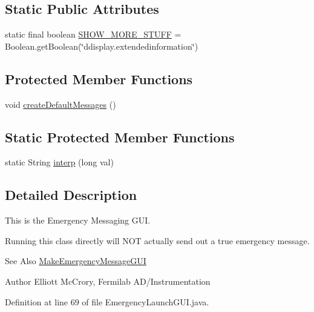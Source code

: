 \subsection*{Static Public Attributes}
\begin{DoxyCompactItemize}
\item 
static final boolean \hyperlink{classgov_1_1fnal_1_1ppd_1_1dd_1_1emergency_1_1EmergencyLaunchGUI_a38b676d30b6ac1c12dbc4b790f93b729}{S\-H\-O\-W\-\_\-\-M\-O\-R\-E\-\_\-\-S\-T\-U\-F\-F} = Boolean.\-get\-Boolean(\char`\"{}ddisplay.\-extendedinformation\char`\"{})
\end{DoxyCompactItemize}
\subsection*{Protected Member Functions}
\begin{DoxyCompactItemize}
\item 
void \hyperlink{classgov_1_1fnal_1_1ppd_1_1dd_1_1emergency_1_1EmergencyLaunchGUI_ac3a291908743dcb58758bfc8d56ce127}{create\-Default\-Messages} ()
\end{DoxyCompactItemize}
\subsection*{Static Protected Member Functions}
\begin{DoxyCompactItemize}
\item 
static String \hyperlink{classgov_1_1fnal_1_1ppd_1_1dd_1_1emergency_1_1EmergencyLaunchGUI_a7d9de8a18d1e65facf89c233cfcafc83}{interp} (long val)
\end{DoxyCompactItemize}


\subsection{Detailed Description}
This is the Emergency Messaging G\-U\-I.

Running this class directly will N\-O\-T actually send out a true emergency message. \begin{DoxySeeAlso}{See Also}
\hyperlink{classgov_1_1fnal_1_1ppd_1_1dd_1_1emergency_1_1MakeEmergencyMessageGUI}{Make\-Emergency\-Message\-G\-U\-I}
\end{DoxySeeAlso}
\begin{DoxyAuthor}{Author}
Elliott Mc\-Crory, Fermilab A\-D/\-Instrumentation 
\end{DoxyAuthor}


Definition at line 69 of file Emergency\-Launch\-G\-U\-I.\-java.



